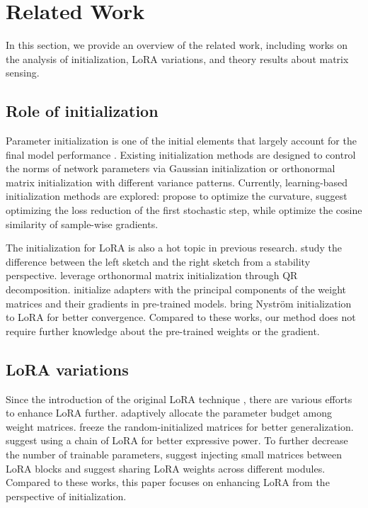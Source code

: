 \section{Related Work}
\label{sec:related}
In this section, we provide an overview of the related work, including works on the analysis of initialization, LoRA variations, and theory results about matrix sensing. 


\subsection{Role of initialization}
Parameter initialization is one of the initial elements that largely account for the final model performance \cite{glorot2010understanding,mishkin2015all}.
Existing initialization methods are designed to control the norms of network parameters via Gaussian initialization \cite{he2015delving} or orthonormal matrix initialization \cite{saxe2013exact} with different variance patterns.
Currently, learning-based initialization methods are explored: \citet{dauphin2019metainit} propose to optimize the curvature, \citet{zhu2021gradinit} suggest optimizing the loss reduction of the first stochastic step, while \citet{yang2022towards} optimize the cosine similarity of sample-wise gradients. 

The initialization for LoRA is also a hot topic in previous research. 
\citet{hayou2024impact} study the difference between the left sketch and the right sketch from a stability perspective. \citet{buyukakyuz2024olora} leverage orthonormal matrix initialization through QR decomposition. \citet{meng2024pissa,wang2024lora} initialize adapters with the principal components of the weight matrices and their gradients in pre-trained models. \citet{li2024crucial} bring Nyström initialization to LoRA for better convergence. Compared to these works, our method does not require further knowledge about the pre-trained weights or the gradient. 

\subsection{LoRA variations}
Since the introduction of the original LoRA technique \cite{hu2021lora}, there are various efforts to enhance LoRA further. \citet{zhang2023adalora} adaptively allocate the parameter budget among weight matrices. \citet{zhu2024asymmetry} freeze the random-initialized matrices for better generalization. \citet{xia2024chain,malinovsky2024randomized} suggest using a chain of LoRA for better expressive power. 
To further decrease the number of trainable parameters, \citet{balazy2024lora,ponkshe2024initialization} suggest injecting small matrices between LoRA blocks and \citet{kopiczko2023vera,renduchintala2023tied,song2024sharelora} suggest sharing LoRA weights across different modules. Compared to these works, this paper focuses on enhancing LoRA from the perspective of initialization. 

